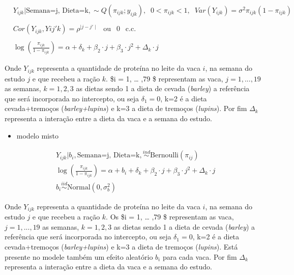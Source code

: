 \documentclass[
  11pt,
]{article}
\providecommand{\tightlist}{%
  \setlength{\itemsep}{0pt}\setlength{\parskip}{0pt}}
\begin{document}
\begin{align*}
&Y_{ijk}|\text{Semana=j, Dieta=k}, \sim Q(\pi_{ijk}; y_{ijk}),\;\; 0 < \pi_{ijk} < 1,  \;\;Var(Y_{ijk}) = \sigma^2 \pi_{ijk}(1-\pi_{ijk}) \\
\\
&Cor(Y_{ijk}, Y{ij'k}) = \rho^{\mid j-j' \mid} \;\;\ \text{ou} \;\;\ 0 \;\;\ \text{c.c.} \\
\\
&\log\left( \frac{\pi_{ijk}}{1 - \pi_{ijk}}  \right) = \alpha + \delta_{k}  + \beta_2\cdot j + \beta_3 \cdot j^2   + \Delta_k \cdot j
\end{align*}

Onde \(Y_{ijk}\) representa a quantidade de proteína no leite da vaca \(i\), na semana do estudo \(j\) e que recebeu a ração \(k\). \$i = 1, \ldots{} ,79 \$ representam as vaca, \(j = 1, ..., 19\) as semanas, \(k = 1, 2, 3\) as dietas sendo 1 a dieta de cevada (\emph{barley}) a referência que será incorporada no intercepto, ou seja \(\delta_1 = 0\), k=2 é a dieta cevada+tremoços (\emph{barley+lupins}) e k=3 a dieta de tremoços (\emph{lupins}). Por fim \(\Delta_k\) representa a interação entre a dieta da vaca e a semana do estudo.

\begin{itemize}
\tightlist
\item
  modelo misto
\end{itemize}

\begin{align*}
&Y_{ijk}|b_i, \text{Semana=j, Dieta=k}, \stackrel{ind}{\sim} \text{Bernoulli}(\pi_{ij}) \\
&\log\left( \frac{\pi_{ijk}}{1 - \pi_{ijk}}  \right) = \alpha + b_i+ \delta_{k}  + \beta_2\cdot j + \beta_3 \cdot j^2 + \Delta_k \cdot j \\
&b_i \stackrel{iid}{\sim} \text{Normal}(0, \sigma_b^2)
\end{align*}

Onde \(Y_{ijk}\) representa a quantidade de proteína no leite da vaca \(i\), na semana do estudo \(j\) e que recebeu a ração \(k\). Os \$i = 1, \ldots{} ,79 \$ representam as vaca, \(j = 1, ..., 19\) as semanas, \(k = 1, 2, 3\) as dietas sendo 1 a dieta de cevada (\emph{barley}) a referência que será incorporada no intercepto, ou seja \(\delta_1 = 0\), k=2 é a dieta cevada+tremoços (\emph{barley+lupins}) e k=3 a dieta de tremoços (\emph{lupins}). Está presente no modele também um efeito aleatório \(b_i\) para cada vaca. Por fim \(\Delta_k\) representa a interação entre a dieta da vaca e a semana do estudo.
\end{document}
